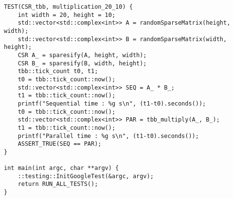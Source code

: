 \documentclass{report}
\begin{document}
\begin{lstlisting}
TEST(CSR_tbb, multiplication_20_10) {
    int width = 20, height = 10;
    std::vector<std::complex<int>> A = randomSparseMatrix(height, width);
    std::vector<std::complex<int>> B = randomSparseMatrix(width, height);
    CSR A_ = sparesify(A, height, width);
    CSR B_ = sparesify(B, width, height);
    tbb::tick_count t0, t1;
    t0 = tbb::tick_count::now();
    std::vector<std::complex<int>> SEQ = A_ * B_;
    t1 = tbb::tick_count::now();
    printf("Sequential time : %g s\n", (t1-t0).seconds());
    t0 = tbb::tick_count::now();
    std::vector<std::complex<int>> PAR = tbb_multiply(A_, B_);
    t1 = tbb::tick_count::now();
    printf("Parallel time : %g s\n", (t1-t0).seconds());
    ASSERT_TRUE(SEQ == PAR);
}

int main(int argc, char **argv) {
    ::testing::InitGoogleTest(&argc, argv);
    return RUN_ALL_TESTS();
}
\end{lstlisting}
\end{document}
